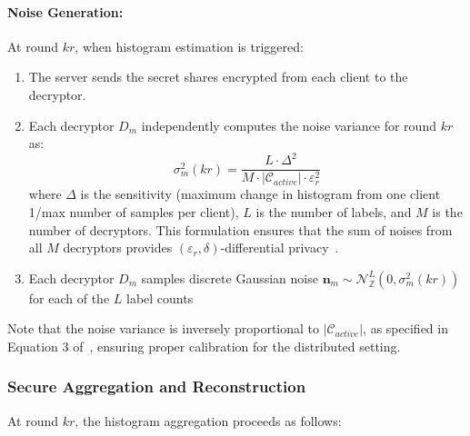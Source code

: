 \documentclass[runningheads]{llncs}
\begin{document}
\paragraph{Noise Generation:} At round $kr$, when histogram estimation is triggered:
\begin{enumerate}
    \item The server sends the secret shares encrypted from each client to the decryptor.
    \item Each decryptor $D_m$ independently computes the noise variance for round $kr$ as:
    \begin{equation}
        \sigma_m^2(kr) = \frac{L \cdot \Delta^2}{M \cdot |\mathcal{C}_{active}| \cdot \varepsilon_r^2}
    \end{equation}
    where $\Delta$ is the sensitivity (maximum change in histogram from one client 1/max number of samples per client), $L$ is the number of labels, and $M$ is the number of decryptors. This formulation ensures that the sum of noises from all $M$ decryptors provides $(\varepsilon_r, \delta)$-differential privacy~\cite{kairouz2021distributed,arxiv2601.09460}.
    
    \item Each decryptor $D_m$ samples discrete Gaussian noise $\mathbf{n}_m \sim \mathcal{N}_\mathbb{Z}^L(0, \sigma_m^2(kr))$ for each of the $L$ label counts
\end{enumerate}

Note that the noise variance is inversely proportional to $|\mathcal{C}_{active}|$, as specified in Equation 3 of~\cite{arxiv2601.09460}, ensuring proper calibration for the distributed setting.

\subsubsection{Secure Aggregation and Reconstruction}

At round $kr$, the histogram aggregation proceeds as follows:
\end{document}
